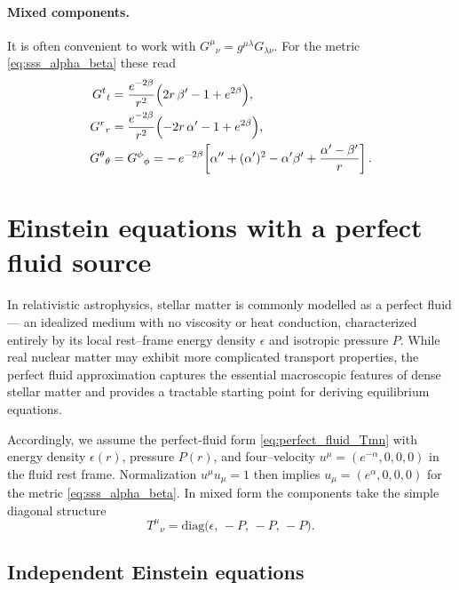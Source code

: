 \paragraph{Mixed components.}
It is often convenient to work with $G^{\mu}{}_{\nu}=g^{\mu\lambda}G_{\lambda\nu}$. 
For the metric \eqref{eq:sss_alpha_beta} these read
\begin{align}
G^{t}{}_{t} &= \frac{e^{-2\beta}}{r^{2}}\Bigl(2r\,\beta'-1+e^{2\beta}\Bigr),\label{eq:Gtt_mixed}\\
G^{r}{}_{r} &= \frac{e^{-2\beta}}{r^{2}}\Bigl(-2r\,\alpha'-1+e^{2\beta}\Bigr),\label{eq:Grr_mixed}\\
G^{\theta}{}_{\theta} &= G^{\phi}{}_{\phi}
= -\,e^{-2\beta}\!\left[\alpha''+(\alpha')^{2}-\alpha'\beta'+\frac{\alpha'-\beta'}{r}\right].
\label{eq:Gang_mixed}
\end{align}

\section{Einstein equations with a perfect fluid source}

In relativistic astrophysics, stellar matter is commonly modelled as a
perfect fluid --- an idealized medium with no viscosity or heat conduction,
characterized entirely by its local rest--frame energy density $\epsilon$
and isotropic pressure $P$. While real nuclear matter may exhibit more
complicated transport properties, the perfect fluid approximation
captures the essential macroscopic features of dense stellar matter
and provides a tractable starting point for deriving equilibrium equations.

Accordingly, we assume the perfect-fluid form \eqref{eq:perfect_fluid_Tmn}
with energy density $\epsilon(r)$, pressure $P(r)$, and four–velocity
$u^\mu=(e^{-\alpha},0,0,0)$ in the fluid rest frame.
Normalization $u^\mu u_\mu=1$ then implies $u_\mu=(e^{\alpha},0,0,0)$ 
for the metric \eqref{eq:sss_alpha_beta}.  
In mixed form the components take the simple diagonal structure
\begin{equation}
T^{\mu}{}_{\nu}=\mathrm{diag}\!\big(\epsilon,\,-P,\,-P,\,-P\big).
\end{equation}

\subsection*{Independent Einstein equations}


